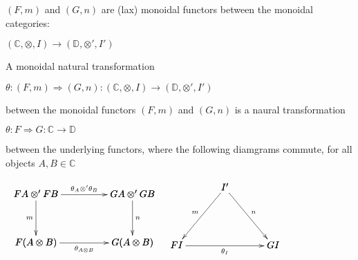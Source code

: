 \begin{definition}
\label{def:monoidal_natural_transformation}
$(F,m)$ and $(G,n)$ are (lax) monoidal functors between the monoidal categories:
\begin{center}
    \begin{math}
        (\mathbb{C}, \otimes, I) \rightarrow (\mathbb{D}, \otimes ', I')
    \end{math}
\end{center}
A monoidal natural transformation
\begin{center}
    \begin{math}
        \theta : (F,m) \Rightarrow (G,n) : (\mathbb{C}, \otimes, I) \rightarrow (\mathbb{D}, \otimes ', I')
    \end{math}
\end{center}
between the monoidal functors $(F,m)$ and $(G,n)$ is a naural transformation
\begin{center}
    \begin{math}
        \theta : F \Rightarrow G : \mathbb{C} \rightarrow \mathbb{D}
    \end{math}
\end{center}
between the underlying functors, where the following diamgrams commute, for all objects $A,B \in \mathbb{C}$
\begin{center}
    \begin{math}
        \begin{array}{lr}
            \bfig
                \square|alrb|<1000,500>[
                    FA \otimes ' FB`
                    GA \otimes ' GB`
                    F(A \otimes B)`
                    G(A \otimes B);
                    \theta_A \otimes ' \theta_B`
                    m`
                    n`
                    \theta_{A \otimes B}
                ]
            \efig
            &
            \bfig
                \Atriangle<500,600>[
                    I'`
                    FI`
                    GI;
                    m`
                    n`
                    \theta_I
                ]
            \efig
        \end{array}
    \end{math}
\end{center}
\cite{mellies2009}
\end{definition}


